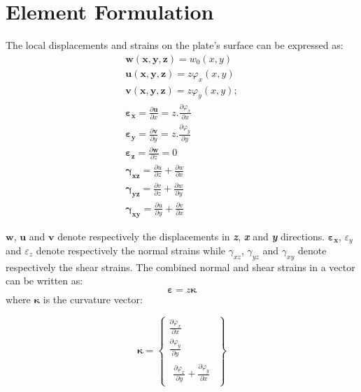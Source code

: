 \documentclass[12pt, a4paper]{report}
\begin{document}
\section{Element Formulation}
The local displacements and strains on the plate's surface can be expressed as:\cite{plate1}
\begin{gather}
\boldsymbol{w(x,y,z)} = w_0(x,y)\\
\boldsymbol{u(x,y,z)}=z\varphi_x(x,y)\\
\boldsymbol{v(x,y,z)}=z\varphi_y(x,y);\\
\boldsymbol{\varepsilon_x}= \frac{\partial \boldsymbol{u}}{\partial x}=z.\frac{\partial \varphi_x}{\partial x}\\
\boldsymbol{\varepsilon_y}= \frac{\partial \boldsymbol{v}}{\partial y}=z.\frac{\partial \varphi_y}{\partial y}\\
\boldsymbol{\varepsilon_z}= \frac{\partial \boldsymbol{w}}{\partial z}=0\\
\boldsymbol{\gamma_{xz}} = \frac{\partial u}{\partial z} + \frac{\partial w}{\partial x}\\
\boldsymbol{\gamma_{yz}} = \frac{\partial v}{\partial z} + \frac{\partial w}{\partial y}\\
\boldsymbol{\gamma_{xy}} = \frac{\partial u}{\partial y} + \frac{\partial v}{\partial x}
\end{gather}

$\boldsymbol{w}$, $\boldsymbol{u}$ and $\boldsymbol{v}$ denote respectively the displacements in \textbf{\textit{z}}, \textbf{\textit{x}} and \textbf{\textit{y}} directions. $\boldsymbol{\varepsilon_x}$, $\varepsilon_y$  and $\varepsilon_z$ denote respectively the normal strains while $\gamma_{xz}$, $\gamma_{yz}$ and $\gamma_{xy}$ denote respectively the shear strains.
The combined normal and shear strains in a vector can be written as:
\begin{equation}
    \boldsymbol{\varepsilon}=z\boldsymbol{\kappa}
\end{equation}
where $\boldsymbol{\kappa}$ is the curvature vector:
\vspace{-50pt}
\begin{center}
\begin{equation}
\boldsymbol{\kappa} = 
\left\{
\begin{array}{c}
\frac{\partial \varphi_x}{\partial x} \\
\frac{\partial \varphi_y}{\partial y} \\
\begin{aligned}
\frac{\partial \varphi_x}{\partial y}+ \frac{\partial \varphi_y}{\partial x}
\end{aligned}
\end{array}
\right\}
\end{equation}
\end{center}
\end{document}
